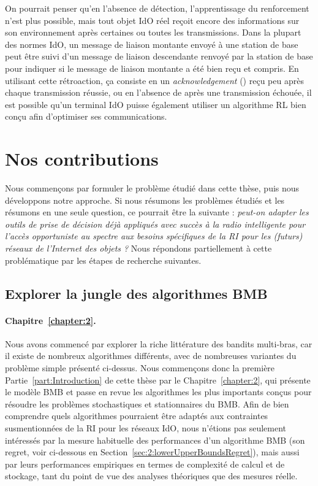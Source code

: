 \begin{resume_fr}
On pourrait penser qu'en l'absence de détection, l'apprentissage du renforcement n'est plus possible, mais tout objet IdO réel reçoit encore des informations sur son environnement après certaines ou toutes les transmissions.
Dans la plupart des normes IdO, un message de liaison montante envoyé à une station de base peut être suivi d'un message de liaison descendante renvoyé par la station de base pour indiquer si le message de liaison montante a été bien reçu et compris.
%
En utilisant cette rétroaction, ça consiste en un \emph{acknowledgement} (\Ack) reçu peu après chaque transmission réussie, ou en l'absence de \Ack{} après une transmission échouée, il est possible qu'un terminal IdO puisse également utiliser un algorithme RL bien conçu afin d'optimiser ses communications.



\section*{Nos contributions}

Nous commençons par formuler le problème étudié dans cette thèse, puis nous développons notre approche.
%
Si nous résumons les problèmes étudiés et les résumons en une seule question, ce pourrait être la suivante :
\emph{peut-on adapter les outils de prise de décision déjà appliqués avec succès à la radio intelligente pour l'accès opportuniste au spectre aux besoins spécifiques de la RI pour les (futurs) réseaux de l'Internet des objets ?}
%
Nous répondons partiellement à cette problématique par les étapes de recherche suivantes.



\subsection*{Explorer la jungle des algorithmes BMB}

\paragraph{Chapitre~\ref{chapter:2}.}
%
Nous avons commencé par explorer la riche littérature des bandits multi-bras,
car il existe de nombreux algorithmes différents, avec de nombreuses variantes du problème simple présenté ci-dessus.
Nous commençons donc la première Partie~\ref{part:Introduction} de cette thèse par le Chapitre~\ref{chapter:2}, qui présente le modèle BMB et passe en revue les algorithmes les plus importants conçus pour résoudre les problèmes stochastiques et stationnaires du BMB.
%
Afin de bien comprendre quels algorithmes pourraient être adaptés aux contraintes susmentionnées de la RI pour les réseaux IdO,
nous n'étions pas seulement intéressés par la mesure habituelle des performances d'un algorithme BMB (son regret, voir ci-dessous en Section~\ref{sec:2:lowerUpperBoundsRegret}),
mais aussi par leurs performances empiriques en termes de complexité de calcul et de stockage, tant du point de vue des analyses théoriques que des mesures réelle.



\end{resume_fr}
